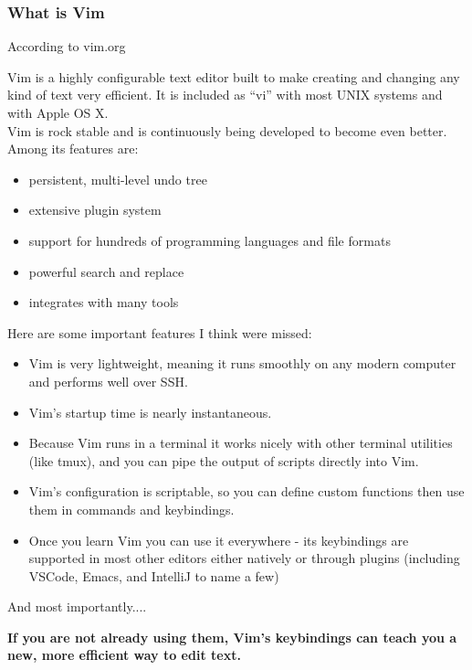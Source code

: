 \documentclass{beamer}
\begin{document}
\begin{frame}
    \frametitle{What is Vim}
    \centerline{\large According to vim.org}
    \vspace{0.5cm}
    \small Vim is a highly configurable text editor built to make creating and changing any kind of text very efficient. It is included as \enquote{vi} with most UNIX systems and with Apple OS X.\\
    \vspace{0.5cm}
    Vim is rock stable and is continuously being developed to become even better. Among its features are:\\
    \begin{itemize}
	\item persistent, multi-level undo tree
	\item extensive plugin system
	\item support for hundreds of programming languages and file formats
	\item powerful search and replace
	\item integrates with many tools
    \end{itemize}
\end{frame}

\begin{frame}
    \centerline{\large Here are some important features I think were missed:}
    \vspace{0.5cm}
    \small
    \begin{itemize}
	\item Vim is very lightweight, meaning it runs smoothly on any modern computer and performs well over SSH.
	\item Vim's startup time is nearly instantaneous.
	\item Because Vim runs in a terminal it works nicely with other terminal utilities (like tmux), and you can pipe the output of scripts directly into Vim.
	\item Vim's configuration is scriptable, so you can define custom functions then use them in commands and keybindings.
	\item Once you learn Vim you can use it everywhere - its keybindings are supported in most other editors either natively or through plugins (including VSCode, Emacs, and IntelliJ to name a few)
    \end{itemize}
\end{frame}

\begin{frame}
    \centerline{\large And most importantly....}
    \vspace{0.5cm}
    \small \textbf{If you are not already using them, Vim's keybindings can teach you a new, more efficient way to edit text.}\\
\end{frame}
\end{document}
